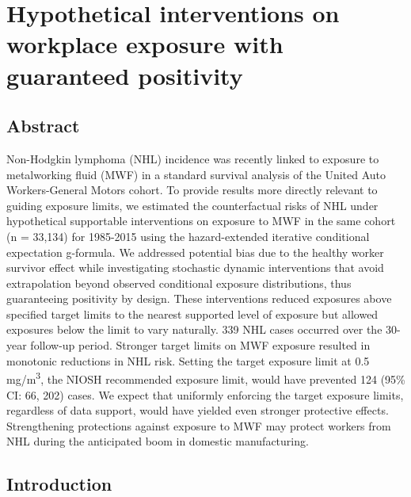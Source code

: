 \documentclass[
  11pt,
  letterpaper,
  DIV=11,
  numbers=noendperiod]{scrartcl}
\author{}
\date{}
\begin{document}
\section{Hypothetical interventions on workplace exposure with
guaranteed
positivity}\label{hypothetical-interventions-on-workplace-exposure-with-guaranteed-positivity}

\subsection{Abstract}\label{abstract}

Non-Hodgkin lymphoma (NHL) incidence was recently linked to exposure to
metalworking fluid (MWF) in a standard survival analysis of the United
Auto Workers-General Motors cohort. To provide results more directly
relevant to guiding exposure limits, we estimated the counterfactual
risks of NHL under hypothetical supportable interventions on exposure to
MWF in the same cohort (n = 33,134) for 1985-2015 using the
hazard-extended iterative conditional expectation g-formula. We
addressed potential bias due to the healthy worker survivor effect while
investigating stochastic dynamic interventions that avoid extrapolation
beyond observed conditional exposure distributions, thus guaranteeing
positivity by design. These interventions reduced exposures above
specified target limits to the nearest supported level of exposure but
allowed exposures below the limit to vary naturally. 339 NHL cases
occurred over the 30-year follow-up period. Stronger target limits on
MWF exposure resulted in monotonic reductions in NHL risk. Setting the
target exposure limit at 0.5 mg/m\textsuperscript{3}, the NIOSH
recommended exposure limit, would have prevented 124 (95\% CI: 66, 202)
cases. We expect that uniformly enforcing the target exposure limits,
regardless of data support, would have yielded even stronger protective
effects. Strengthening protections against exposure to MWF may protect
workers from NHL during the anticipated boom in domestic manufacturing.

\newpage{}

\subsection{Introduction}\label{introduction}
\end{document}
